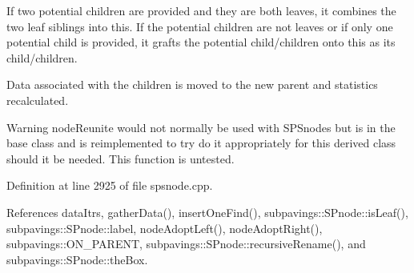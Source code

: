 \-If two potential children are provided and they are both leaves, it combines the two leaf siblings into this. \-If the potential children are not leaves or if only one potential child is provided, it grafts the potential child/children onto this as its child/children.

\-Data associated with the children is moved to the new parent and statistics recalculated.

\begin{DoxyWarning}{\-Warning}
node\-Reunite would not normally be used with \-S\-P\-Snodes but is in the base class and is reimplemented to try do it appropriately for this derived class should it be needed. \-This function is untested. 
\end{DoxyWarning}


\-Definition at line 2925 of file spsnode.\-cpp.



\-References data\-Itrs, gather\-Data(), insert\-One\-Find(), subpavings\-::\-S\-Pnode\-::is\-Leaf(), subpavings\-::\-S\-Pnode\-::label, node\-Adopt\-Left(), node\-Adopt\-Right(), subpavings\-::\-O\-N\-\_\-\-P\-A\-R\-E\-N\-T, subpavings\-::\-S\-Pnode\-::recursive\-Rename(), and subpavings\-::\-S\-Pnode\-::the\-Box.


